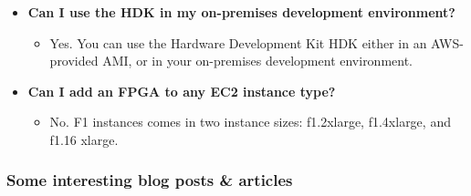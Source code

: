 \documentclass[a4paper]{article}
\begin{document}
\begin{itemize}
        \item[\ding{42}]
        \label{Can I use the HDK in my on-premises development environment?}
        \hypertarget{Can I use the HDK in my on-premises development environment?}{\textbf{Can I use the HDK in my on-premises development environment?}}
        \begin{itemize}
            \item[\ding{45}] Yes. You can use the Hardware Development Kit HDK either in an AWS-provided AMI, or in your on-premises development environment.
        \end{itemize}

        \item[\ding{42}]
        \label{Can I add an FPGA to any EC2 instance type?}
        \hypertarget{Can I add an FPGA to any EC2 instance type?}{\textbf{Can I add an FPGA to any EC2 instance type?}}
        \begin{itemize}
            \item[\ding{45}] No. F1 instances comes in two instance sizes: f1.2xlarge, f1.4xlarge, and f1.16 xlarge.
        \end{itemize}
    \end{itemize}
    
    \newpage

    \subsubsection{Some interesting blog posts \& articles}
\end{document}
